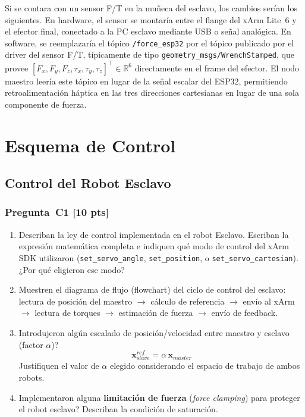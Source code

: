 \documentclass[journal,10pt,twoside]{IEEEtran}
\newcommand{\pts}[1]{\textbf{\color{tec_red}[#1 pts]}}
\begin{document}
Si se contara con un sensor F/T en la muñeca del 
esclavo, los cambios serían los siguientes. En hardware, el sensor 
se montaría entre el flange del xArm Lite~6 y el efector final, 
conectado a la PC esclavo mediante USB o señal analógica. En 
software, se reemplazaría el tópico \texttt{/force\_esp32} por el 
tópico publicado por el driver del sensor F/T, típicamente de tipo 
\texttt{geometry\_msgs/WrenchStamped}, que provee $[F_x, F_y, F_z, 
\tau_x, \tau_y, \tau_z]^\top \in \mathbb{R}^6$ directamente en el 
frame del efector. El nodo maestro leería este tópico en lugar de 
la señal escalar del ESP32, permitiendo retroalimentación háptica 
en las tres direcciones cartesianas en lugar de una sola componente 
de fuerza.

\section{Esquema de Control}
\label{sec:control}

\subsection{Control del Robot Esclavo}

\subsubsection*{Pregunta~C1 \pts{10}}
\begin{enumerate}[label=(\alph*)]
      \item Describan la ley de control implementada en el robot Esclavo.
            Escriban la expresión matemática completa e indiquen qué modo
            de control del xArm SDK utilizaron
            (\texttt{set\_servo\_angle}, \texttt{set\_position},
            o \texttt{set\_servo\_cartesian}).
            ¿Por qué eligieron ese modo?
  \item Muestren el diagrama de flujo (flowchart) del ciclo de control
        del esclavo: lectura de posición del maestro $\rightarrow$
        cálculo de referencia $\rightarrow$ envío al xArm $\rightarrow$
        lectura de torques $\rightarrow$ estimación de fuerza
        $\rightarrow$ envío de feedback.
  \item Introdujeron algún escalado de posición/velocidad entre
        maestro y esclavo (factor $\alpha$)?
        \[
          \bm{x}_{slave}^{ref} = \alpha\,\bm{x}_{master}
        \]
        Justifiquen el valor de $\alpha$ elegido considerando
        el espacio de trabajo de ambos robots.
  \item Implementaron alguna \textbf{limitación de fuerza}
        (\textit{force clamping}) para proteger el robot esclavo?
        Describan la condición de saturación.
\end{enumerate}
\end{document}
